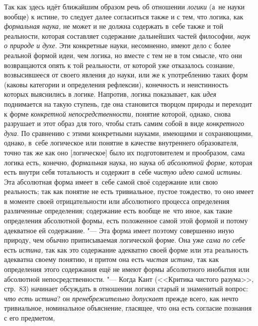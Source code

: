Так как здесь идёт ближайшим образом речь об отношении
{\em логики} (а~не науки
вообще) к истине, то следует далее согласиться также и с тем, что логика,
как {\em формальная наука,}
не может и не должна содержать в~себе также и той реальности,
которая составляет содержание дальнейших частей философии,
{\em наук о природе и духе}.
Эти конкретные науки, несомненно, имеют дело с более реальной
формой идеи, чем логика, но вместе с тем не в том смысле, что они
возвращаются опять к той реальности, от которой уже отказалось сознание,
возвысившееся от своего явления до науки, или же к употреблению таких форм
(каковы категории и определения рефлексии), конечность и неистинность
которых выяснились в логике. Напротив, логика показывает, как
{\em идея} поднимается на
такую ступень, где она становится творцом природы и переходит к форме
{\em конкретной непосредственности,}
понятие которой, однако, снова разрушает и этот образ для
того, чтобы стать самим собой в виде
{\em конкретного духа}.
По сравнению с этими конкретными науками, имеющими и
сохраняющими, однако, в~себе логическое или понятие в качестве внутреннего
образователя, точно так же как оно [логическое] было их подготовителем и
прообразом, сама логика есть, конечно,
{\em формальная} наука,
но наука об {\em абсолютной форме,}
которая есть внутри себя тотальность и содержит в~себе
{\em чистую идею самой истины}.
Эта абсолютная форма имеет в~себе самой своё содержание или
свою реальность; так как понятие не есть тривиальное, пустое тождество, то
оно имеет в моменте своей отрицательности или абсолютного процесса
определения различенные определения; содержание есть вообще не~что иное,
как такие определения абсолютной формы, есть положенное самой этой формой и
потому адекватное ей содержание. "--- Эта форма имеет поэтому
совершенно иную природу, чем обычно приписываемая логической
форме. Она уже {\em сама по себе}
есть {\em истина,}
так как это содержание адекватно своей форме или эта
реальность адекватна своему понятию, и притом она есть
{\em чистая истина,} так
как определения этого содержания ещё не имеют формы абсолютного инобытия
или абсолютной непосредственности. "--- Когда Кант (<<Критика
чистого разума>>, стр.~83) начинает обсуждать в отношении логики старый и
знаменитый вопрос: {\em что есть
истина}? он
{\em пренебрежительно допускает}
прежде всего, как нечто тривиальное, номинальное
объяснение, гласящее, что она есть согласие познания с его
предметом,
